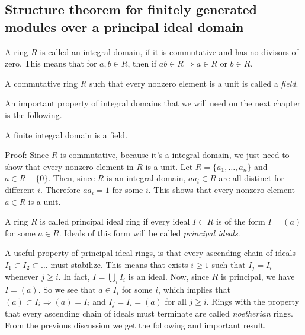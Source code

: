 \subsection{Structure theorem for finitely generated modules over a principal ideal domain}
\begin{dang}
\begin{definition}\cite{lidl1994introduction}
    A ring $R$ is called an integral domain, if it is commutative and has no divisors of zero. This means that for $a,b\in R$, then if $ab\in R\Rightarrow a\in R$ or $b\in R$.
\end{definition}
\end{dang}
\begin{dang}
    \begin{definition}\cite{lidl1994introduction}
        A commutative ring $R$ such that every nonzero element is a unit is called a \textit{field}.
    \end{definition}
\end{dang}
An important property of integral domains that we will need on the next chapter is the following.
\begin{dang}
    \begin{theorem}\label{a finite integral domain is a field}\cite{lidl1994introduction}
        A finite integral domain is a field.
    \end{theorem}
\end{dang}
Proof: Since $R$ is commutative, because it's a integral domain, we just need to show that every nonzero element in $R$ is a unit. Let $R=\{a_1,\dots,a_n\}$ and $a\in R-\{0\}$. Then, since $R$ is an integral domain, $aa_i\in R$ are all distinct for different $i$. Therefore $aa_i=1$ for some $i$. This shows that every nonzero element $a\in R$ is a unit.
\begin{dang}
    \begin{definition}\cite{hungerford2012algebra}
        A ring $R$ is called principal ideal ring if every ideal $I\subset R$ is of the form $I=(a)$ for some $a\in R$. Ideals of this form will be called \textit{principal ideals}. 
    \end{definition}
\end{dang}
A useful property of principal ideal rings, is that every ascending chain of ideals $I_1\subset I_2\subset \dots$ must stabilize. This means that exists $i\geq1$ such that $I_j=I_i$ whenever $j\geq i$. In fact, $I=\bigcup_i I_i$ is an ideal. Now, since $R$ is principal, we have $I=(a)$. So we see that $a\in I_i$ for some $i$, which implies that $(a)\subset I_i\Rightarrow (a) = I_i$ and $I_j=I_i=(a)$ for all $j\geq i$. Rings with the property that every ascending chain of ideals must terminate are called \textit{noetherian} rings. From the previous discussion we get the following and important result.
